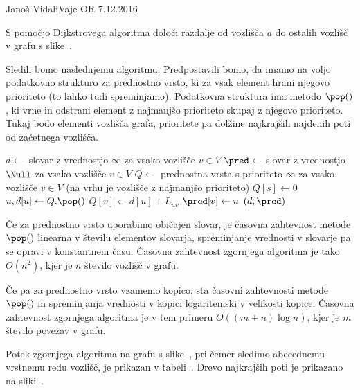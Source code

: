 \begin{naloga}{Janoš Vidali}{Vaje OR 7.12.2016}
\begin{vprasanje}
S pomočjo Dijkstrovega algoritma
določi razdalje od vozlišča $a$ do ostalih vozlišč
v grafu s slike~\fig.

\begin{slika}
\pgfslika
{}
\end{slika}
\end{vprasanje}


\begin{odgovor}
Sledili bomo naslednjemu algoritmu.
Predpostavili bomo,
da imamo na voljo podatkovno strukturo za prednostno vrsto,
ki za vsak element hrani njegovo prioriteto (to lahko tudi spreminjamo).
Podatkovna struktura ima metodo $\pop()$,
ki vrne in odstrani element z najmanjšo prioriteto
skupaj z njegovo prioriteto.
Tukaj bodo elementi vozlišča grafa,
prioritete pa dolžine najkrajših najdenih poti od začetnega vozlišča.
\begin{small}
\begin{algorithmic}
    \State $d \gets$ slovar z vrednostjo $\infty$ za vsako vozlišče $v \in V$
    \State $\pred \gets$ slovar z vrednostjo $\Null$
        za vsako vozlišče $v \in V$
	\State $Q \gets$ prednostna vrsta
        s prioriteto $\infty$ za vsako vozlišče $v \in V$
        (na vrhu je vozlišče z najmanjšo prioriteto)
	\State $Q[s] \gets 0$
		\State $u, d[u] \gets Q.\pop()$
				\State $Q[v] \gets d[u] + L_{uv}$
                \State $\pred[v] \gets u$
			\EndIf
		\EndFor
	\EndWhile
    \State \Return $(d, \pred)$
\EndFunction
\end{algorithmic}
\end{small}
Če za prednostno vrsto uporabimo običajen slovar,
je časovna zahtevnost metode $\pop()$ linearna v številu elementov slovarja,
spreminjanje vrednosti v slovarje pa se opravi v konstantnem času.
Časovna zahtevnost zgornjega algoritma je tako $O(n^2)$,
kjer je $n$ število vozlišč v grafu.

Če pa za prednostno vrsto vzamemo kopico,
sta časovni zahtevnosti metode $\pop()$ in spreminjanja vrednosti v kopici
logaritemski v velikosti kopice.
Časovna zahtevnost zgornjega algoritma je v tem primeru $O((m+n) \log n)$,
kjer je $m$ število povezav v grafu.

Potek zgornjega algoritma na grafu s slike~\fig,
pri čemer sledimo abecednemu vrstnemu redu vozlišč,
je prikazan v tabeli~\tab.
Drevo najkrajših poti je prikazano na sliki~.


\end{odgovor}
\end{naloga}
